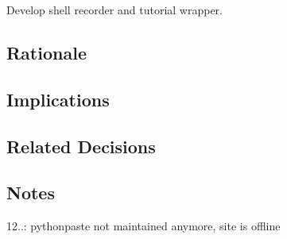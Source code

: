 Develop shell recorder and tutorial wrapper.

\subsection*{Rationale}

\subsection*{Implications}

\subsection*{Related Decisions}

\subsection*{Notes}


\begin{DoxyItemize}
\item 12..\+: pythonpaste not maintained anymore, site is offline 
\end{DoxyItemize}